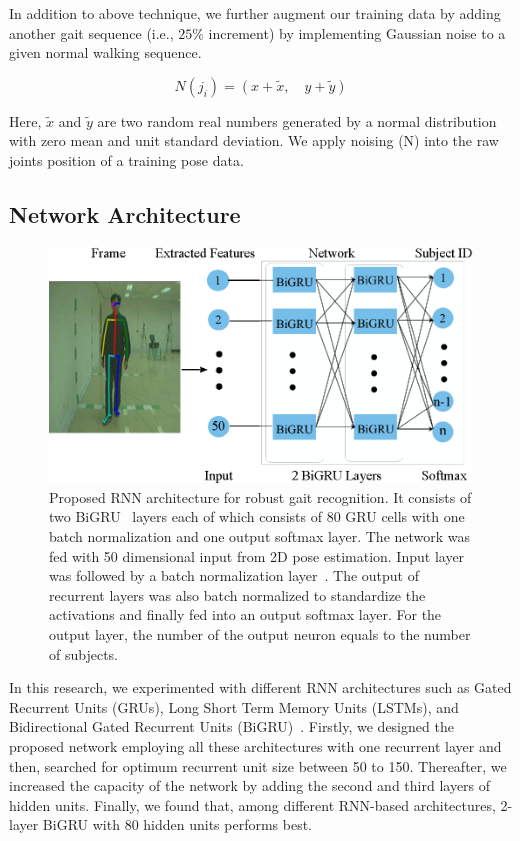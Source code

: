 In addition to above technique, we further augment our training data by adding another gait sequence (i.e., $ 25\% $ increment) by implementing Gaussian noise to a given normal walking sequence. 

\begin{equation}
N(j_i) = (x + \tilde{x},  \quad y+ \tilde{y})
\end{equation}

Here,  $\tilde{x}$ and $\tilde{y}$ are two random real numbers generated by a normal distribution with zero mean and unit standard deviation. We apply noising (N) into the raw joints position of a training pose data.



\subsection{Network Architecture}
\begin{figure}
	\centering 
	\includegraphics[width = 115mm]{figures/rnn_network.eps}
	\caption{
		Proposed RNN architecture for robust gait recognition. It consists of two BiGRU~\cite{Schuster_97} layers each of which consists of 80 GRU cells with one batch normalization and one output softmax layer. The network was fed with 50 dimensional input from 2D pose estimation. Input layer was followed by a batch normalization layer~\cite{Ioffe_15}. The output of recurrent layers was also batch normalized to standardize the activations and finally fed into an output softmax layer. For the output layer, the number of the output neuron equals to the number of subjects.
	}
	\label{fig:rnn_network}
\end{figure}
In this research, we experimented with different RNN architectures such as Gated Recurrent Units (GRUs), Long Short Term Memory Units (LSTMs), and Bidirectional Gated Recurrent Units (BiGRU)~\cite{Schuster_97}. Firstly, we designed the proposed network employing all these architectures with one recurrent layer and then, searched for optimum recurrent unit size between 50 to 150. Thereafter, we increased the capacity of the network by adding the second and third layers of hidden units. Finally, we found that, among different RNN-based architectures, 2-layer BiGRU with 80 hidden units performs best. 

